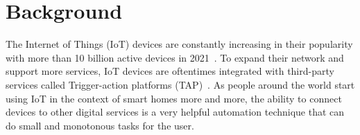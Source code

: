 \section{Background}
\label{sec:background}

The Internet of Things (IoT) devices are constantly increasing in their popularity with more than 10 billion active devices in 2021~\cite{DBLP:webpage/Bojan/IoTstats}. To expand their network and support more services, IoT devices are oftentimes integrated with third-party services called Trigger-action platforms (TAP)~\cite{DBLP:journals/access/XuZZCDG19}. As people around the world start using IoT in the context of smart homes more and more, the ability to connect devices to other digital services is a very helpful automation technique that can do small and monotonous tasks for the user. 